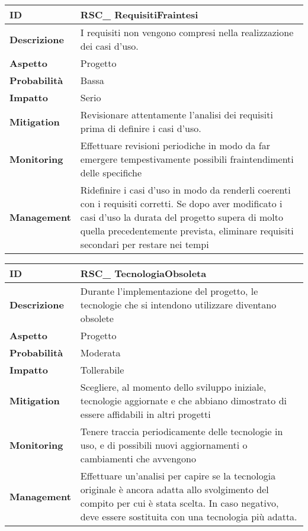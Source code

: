 \begin{tabular}{|p{2.2cm}|p{9.6cm}| }
 	\hline
	\textbf{ID} & RSC\_ RequisitiFraintesi\\ [0.5ex] 
	\hline
	\textbf{Descrizione} & I requisiti non vengono compresi nella realizzazione dei casi d'uso.\\ 
	\hline
	\textbf{Aspetto} &  Progetto\\
	\hline
	\textbf{Probabilità} &  Bassa \\ 
	\hline
	\textbf{Impatto} &  Serio \\ 
	\hline
	\textbf{Mitigation} & Revisionare attentamente l'analisi dei requisiti prima di definire i casi d'uso.\\ 
	\hline
	\textbf{Monitoring} & Effettuare revisioni periodiche in modo da far emergere tempestivamente possibili fraintendimenti delle specifiche\\ 
	\hline
	\textbf{Management} & Ridefinire i casi d'uso in modo da renderli coerenti con i requisiti corretti. Se dopo aver modificato i casi d'uso la durata del progetto supera di molto quella precedentemente prevista, eliminare requisiti secondari per restare nei tempi \\ 
	\hline
\end{tabular}
\clearpage
\begin{tabular}{|p{2.2cm}|p{9.6cm}| }
	\hline
   \textbf{ID} & RSC\_ TecnologiaObsoleta\\ [0.5ex] 
   \hline
   \textbf{Descrizione} & Durante l'implementazione del progetto, le tecnologie che si intendono utilizzare diventano obsolete \\ 
   \hline
   \textbf{Aspetto} &  Progetto \\
   \hline
   \textbf{Probabilità} & Moderata\\ 
   \hline
   \textbf{Impatto} & Tollerabile\\
   \hline
   \textbf{Mitigation} & Scegliere, al momento dello sviluppo iniziale, tecnologie aggiornate e che abbiano dimostrato di essere affidabili in altri progetti \\ 
   \hline
   \textbf{Monitoring} & Tenere traccia periodicamente delle tecnologie in uso, e di possibili nuovi aggiornamenti o cambiamenti che avvengono \\ 
   \hline
   \textbf{Management} & Effettuare un’analisi per capire se la tecnologia originale è ancora adatta allo svolgimento del compito per cui è stata scelta. In caso negativo, deve essere sostituita con una tecnologia più adatta.\\ 
   \hline
\end{tabular}


